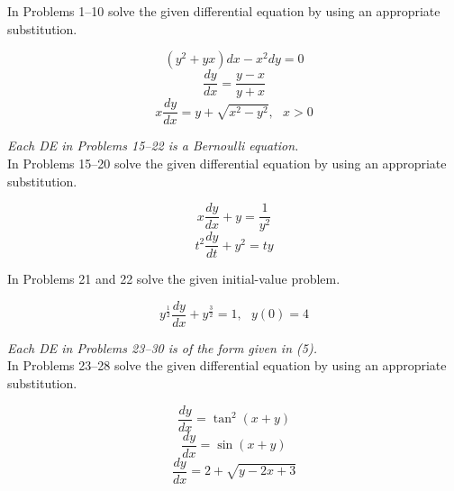 \documentclass[chapter=2,section=5]{math252homework}
\begin{document}
\noindent In Problems 1--10 solve the given differential equation by using an appropriate substitution.
\begin{problems}[start=5]
	\problem \[ \left( y^{2}+yx \right)dx - x^{2}dy = 0 \]
	\setcounter{problemsi}{6}
	\problem \[ \frac{dy}{dx} = \frac{y-x}{y+x} \]
	\setcounter{problemsi}{9}
	\problem \[ x\frac{dy}{dx} = y + \sqrt{x^{2}-y^{2}},\mbox{ }x > 0 \]
\end{problems}

\noindent \emph{Each DE in Problems 15--22 is a Bernoulli equation.}\\
In Problems 15--20 solve the given differential equation by using an appropriate substitution.
\begin{problems}[start=15]
    \problem \[ x\frac{dy}{dx} + y = \frac{1}{y^{2}} \]
	\setcounter{problemsi}{18}
	\problem \[ t^{2}\frac{dy}{dt} + y^{2} = ty \]
\end{problems}

\noindent In Problems 21 and 22 solve the given initial-value problem.
\begin{problems}[start=22]
    \problem \[ y^{\frac{1}{2}}\frac{dy}{dx} + y^{\frac{3}{2}} = 1,\mbox{ }y(0) = 4 \]
\end{problems}

\noindent \emph{Each DE in Problems 23--30 is of the form given in (5).}\\
In Problems 23--28 solve the given differential equation by using an appropriate substitution.
\begin{problems}[start=25]
    \problem \[ \frac{dy}{dx} = \tan^{2}(x+y) \]
	\problem \[ \frac{dy}{dx} = \sin(x+y) \]
	\problem \[ \frac{dy}{dx} = 2 + \sqrt{y-2x+3} \]
\end{problems}
\end{document}
